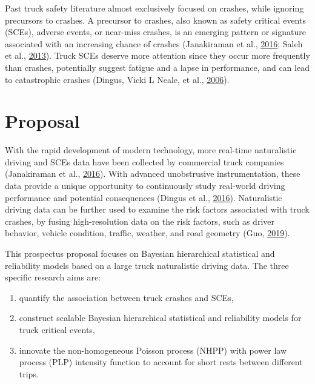 \documentclass[12pt]{book}
\numberwithin{equation}{chapter}
\providecommand{\tightlist}{%
  \setlength{\itemsep}{0pt}\setlength{\parskip}{0pt}}
\begin{document}
Past truck safety literature almost exclusively focused on crashes, while ignoring precursors to crashes. A precursor to crashes, also known as safety critical events (SCEs), adverse events, or near-miss crashes, is an emerging pattern or signature associated with an increasing chance of crashes (Janakiraman et al., \protect\hyperlink{ref-janakiraman2016discovery}{2016}; Saleh et al., \protect\hyperlink{ref-saleh2013accident}{2013}). Truck SCEs deserve more attention since they occur more frequently than crashes, potentially suggest fatigue and a lapse in performance, and can lead to catastrophic crashes (Dingus, Vicki L Neale, et al., \protect\hyperlink{ref-dingus2006development}{2006}).

\hypertarget{proposal}{%
\section{Proposal}\label{proposal}}

With the rapid development of modern technology, more real-time naturalistic driving and SCEs data have been collected by commercial truck companies (Janakiraman et al., \protect\hyperlink{ref-janakiraman2016discovery}{2016}). With advanced unobstrusive instrumentation, these data provide a unique opportunity to continuously study real-world driving performance and potential consequences (Dingus et al., \protect\hyperlink{ref-dingus2016driver}{2016}). Naturalistic driving data can be further used to examine the risk factors associated with truck crashes, by fusing high-resolution data on the risk factors, such as driver behavior, vehicle condition, traffic, weather, and road geometry (Guo, \protect\hyperlink{ref-guo2019statistical}{2019}).

This prospectus proposal focuses on Bayesian hierarchical statistical and reliability models based on a large truck naturalistic driving data. The three specific research aims are:

\begin{enumerate}
\def\labelenumi{\arabic{enumi})}
\tightlist
\item
  quantify the association between truck crashes and SCEs,
\item
  construct scalable Bayesian hierarchical statistical and reliability models for truck critical events,
\item
  innovate the non-homogeneous Poisson process (NHPP) with power law process (PLP) intensity function to account for short rests between different trips.
\end{enumerate}
\end{document}
